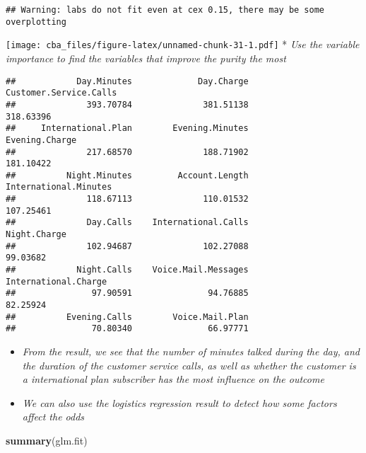 \documentclass[]{article}
\newenvironment{Shaded}{\begin{snugshade}}{\end{snugshade}}
\newcommand{\KeywordTok}[1]{\textcolor[rgb]{0.13,0.29,0.53}{\textbf{#1}}}
\newcommand{\NormalTok}[1]{#1}
\newcommand{\OperatorTok}[1]{\textcolor[rgb]{0.81,0.36,0.00}{\textbf{#1}}}
\begin{document}
\begin{verbatim}
## Warning: labs do not fit even at cex 0.15, there may be some overplotting
\end{verbatim}

\texttt{[image: cba\_files/figure-latex/unnamed-chunk-31-1.pdf]} *
\emph{Use the variable importance to find the variables that improve the
purity the most}

\begin{Shaded}
\end{Shaded}

\begin{verbatim}
##            Day.Minutes             Day.Charge Customer.Service.Calls 
##              393.70784              381.51138              318.63396 
##     International.Plan        Evening.Minutes         Evening.Charge 
##              217.68570              188.71902              181.10422 
##          Night.Minutes         Account.Length  International.Minutes 
##              118.67113              110.01532              107.25461 
##              Day.Calls    International.Calls           Night.Charge 
##              102.94687              102.27088               99.03682 
##            Night.Calls    Voice.Mail.Messages   International.Charge 
##               97.90591               94.76885               82.25924 
##          Evening.Calls        Voice.Mail.Plan 
##               70.80340               66.97771
\end{verbatim}

\begin{itemize}
\item
  \emph{From the result, we see that the number of minutes talked during
  the day, and the duration of the customer service calls, as well as
  whether the customer is a international plan subscriber has the most
  influence on the outcome}
\item
  \emph{We can also use the logistics regression result to detect how
  some factors affect the odds}
\end{itemize}

\begin{Shaded}
\begin{Highlighting}[]
\KeywordTok{summary}\NormalTok{(glm.fit)}
\end{Highlighting}
\end{Shaded}
\end{document}
